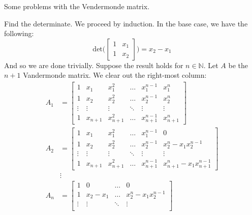 \documentclass{article}                                                        %
\begin{document}
    \begin{problem}
        Some problems with the Vendermonde matrix.
    \end{problem}
    \begin{solution}
        Find the determinate. We proceed by induction. In the base case, we have
        the following:
        \begin{equation}
            \textrm{det}\Big(
                \begin{bmatrix}
                    1&x_{1}\\
                    1&x_{2}
                \end{bmatrix}
            \Big)=
            x_{2}-x_{1}
        \end{equation}
        And so we are done trivially. Suppose the result holds for
        $n\in\mathbb{N}$. Let $A$ be the $n+1$ Vandermonde matrix. We clear out
        the right-most column:
        \begin{align}
            A_{1}&=
            \begin{bmatrix}
                1&x_{1}&x_{1}^{2}&\dots&x_{1}^{n-1}&x_{1}^{n}\\
                1&x_{2}&x_{2}^{2}&\dots&x_{2}^{n-1}&x_{2}^{n}\\
                \vdots&\vdots&\vdots&\ddots&\vdots&\vdots\\
                1&x_{n+1}&x_{n+1}^{2}&\dots&x_{n+1}^{n-1}&x_{n+1}^{n}
            \end{bmatrix}\\
            A_{2}&=
            \begin{bmatrix}
                1&x_{1}&x_{1}^{2}&\dots&x_{1}^{n-1}&0\\
                1&x_{2}&x_{2}^{2}&\dots&x_{2}^{n-1}&x_{2}^{n}-x_{1}x_{2}^{n-1}\\
                \vdots&\vdots&\vdots&\ddots&\vdots&\vdots\\
                1&x_{n+1}&x_{n+1}^{2}&\dots&x_{n+1}^{n-1}
                    &x_{n+1}^{n}-x_{1}x_{n+1}^{n-1}
            \end{bmatrix}\\
            &\vdots\\
            A_{n}&=
            \begin{bmatrix}
                1&0&\dots&0\\
                1&x_{2}-x_{1}&\dots&x_{2}^{n}-x_{1}x_{2}^{n-1}\\
                \vdots&\vdots&\ddots&\vdots\\

\end{bmatrix}
\end{align}
\end{solution}
\end{document}
